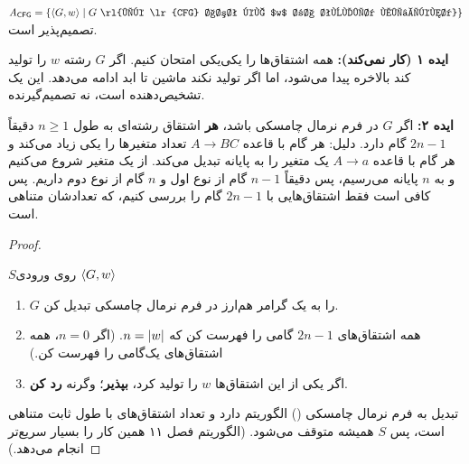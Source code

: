 \begin{theorem}\label{thm:acfg}
$\lng{A}{CFG}=\{\enc{G,w}\st G\ \text{\rl{یک \lr{CFG} است که $w$ را تولید می‌کند}}\}$ تصمیم‌پذیر است.
\end{theorem}

\textbf{ایده ۱ (کار نمی‌کند):} همه اشتقاق‌ها را یکی‌یکی امتحان کنیم. اگر $G$ رشته $w$ را تولید کند بالاخره پیدا می‌شود، اما اگر تولید نکند ماشین تا ابد ادامه می‌دهد. این یک تشخیص‌دهنده است، نه تصمیم‌گیرنده.

\textbf{ایده ۲:} اگر $G$ در فرم نرمال چامسکی باشد، \textbf{هر} اشتقاق رشته‌ای به طول $n\ge1$ دقیقاً $2n-1$ گام دارد. دلیل: هر گام با قاعده $A\to BC$ تعداد متغیرها را یکی زیاد می‌کند و هر گام با قاعده $A\to a$ یک متغیر را به پایانه تبدیل می‌کند. از یک متغیر شروع می‌کنیم و به $n$ پایانه می‌رسیم، پس دقیقاً $n-1$ گام از نوع اول و $n$ گام از نوع دوم داریم. پس کافی است فقط اشتقاق‌هایی با $2n-1$ گام را بررسی کنیم، که تعدادشان متناهی است.

\begin{proof}
\begin{algo}{$S$}{روی ورودی $\langle G,w\rangle$}
\begin{enumerate}
\item $G$ را به یک گرامر هم‌ارز در فرم نرمال چامسکی تبدیل کن.
\item همه اشتقاق‌های $2n-1$ گامی را فهرست کن که $n=\lvert w\rvert$. (اگر $n=0$، همه اشتقاق‌های یک‌گامی را فهرست کن.)
\item اگر یکی از این اشتقاق‌ها $w$ را تولید کرد، \textbf{بپذیر}؛ وگرنه \textbf{رد کن}.
\end{enumerate}
\end{algo}
تبدیل به فرم نرمال چامسکی () الگوریتم دارد و تعداد اشتقاق‌های با طول ثابت متناهی است، پس $S$ همیشه متوقف می‌شود. (الگوریتم  فصل ۱۱ همین کار را بسیار سریع‌تر انجام می‌دهد.)
\end{proof}

